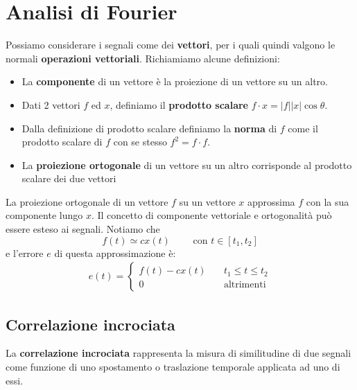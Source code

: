 \documentclass[a4paper, titlepage, oneside]{scrbook}
\begin{document}
\chapter{Analisi di Fourier}
Possiamo considerare i segnali come dei \textbf{vettori}, per i quali quindi valgono le normali \textbf{operazioni vettoriali}.
Richiamiamo alcune definizioni:
\begin{itemize}
	\item La \textbf{componente} di un vettore è la proiezione di un vettore su un altro.
	\item Dati 2 vettori $f$ ed $x$, definiamo il \textbf{prodotto scalare} $f \cdot x = |f||x| \cos\theta$.
	\item Dalla definizione di prodotto scalare definiamo la \textbf{norma} di $f$ come il prodotto scalare di $f$ con se stesso $f^2=f\cdot f$.
	\item La \textbf{proiezione ortogonale} di un vettore su un altro corrisponde al prodotto scalare dei due vettori
\end{itemize}
\begin{figure}[h]
	\centering
\end{figure}
La proiezione ortogonale di un vettore $f$ su un vettore $x$ approssima $f$ con la sua componente lungo $x$. Il concetto di componente vettoriale e ortogonalità può
essere esteso ai segnali. Notiamo che
\begin{equation*}
	f(t) \simeq cx(t) \qquad \text{ con } t \in [t_1,t_2]
\end{equation*}
e l'errore $e$ di questa approssimazione è:
\begin{align*}
	e(t)=
		\begin{cases}
			f(t)-cx(t) \quad &t_1 \leq t \leq t_2\\
			0 \quad &\text{altrimenti}
		\end{cases}
\end{align*}

\section{Correlazione incrociata}
La \textbf{correlazione incrociata} rappresenta la misura di similitudine di due segnali come funzione di uno spostamento o traslazione temporale applicata ad uno di essi.
\end{document}
